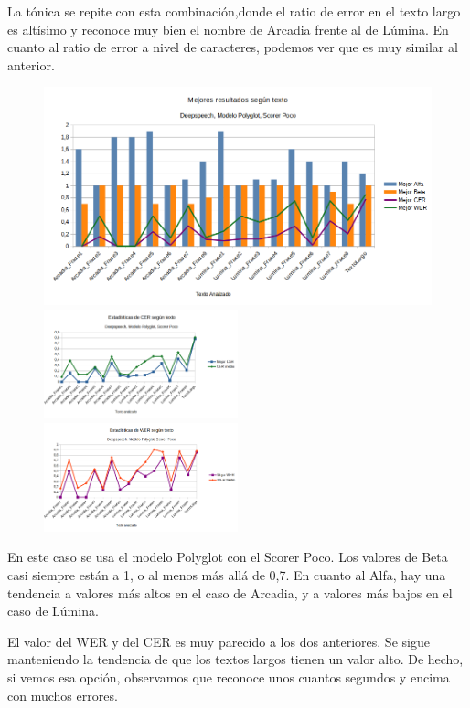 La tónica se repite con esta combinación,donde el ratio de error en el texto largo es altísimo y reconoce muy bien el nombre de Arcadia frente al de Lúmina. En cuanto al ratio de error a nivel de caracteres, podemos ver que es muy similar al anterior.

\begin{figure}[H]
	\includegraphics[width=\textwidth]{imagenes/MejoresResultados_DeepSpeechIvanPocoPolyglot.png} \\
	\includegraphics[width=0.5\textwidth]{imagenes/CER_DeepSpeechIvanPocoPolyglot.png} \hfill \includegraphics[width=0.5\textwidth]{imagenes/WER_DeepspeechIvanPocoPolyglot.png}
\end{figure}

En este caso se usa el modelo Polyglot con el Scorer Poco. Los valores de Beta casi siempre están a 1, o al menos más allá de 0,7. En cuanto al Alfa, hay una tendencia a valores más altos en el caso de Arcadia, y a valores más bajos en el caso de Lúmina.

El valor del WER y del CER es muy parecido a los dos anteriores. Se sigue manteniendo la tendencia de que los textos largos tienen un valor alto. De hecho, si vemos esa opción, observamos que reconoce unos cuantos segundos y encima con muchos errores.

